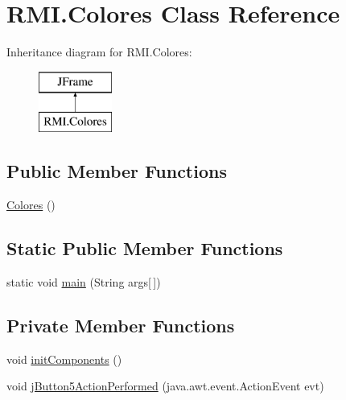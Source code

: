 \hypertarget{class_r_m_i_1_1_colores}{}\section{R\+M\+I.\+Colores Class Reference}
\label{class_r_m_i_1_1_colores}
Inheritance diagram for R\+M\+I.\+Colores\+:\begin{figure}[H]
\begin{center}
\leavevmode
\includegraphics[height=2.000000cm]{class_r_m_i_1_1_colores}
\end{center}
\end{figure}
\subsection*{Public Member Functions}
\begin{DoxyCompactItemize}
\item 
\mbox{\hyperlink{class_r_m_i_1_1_colores_a9d1a322e10d3c217309e02017973b5f0}{Colores}} ()
\end{DoxyCompactItemize}
\subsection*{Static Public Member Functions}
\begin{DoxyCompactItemize}
\item 
static void \mbox{\hyperlink{class_r_m_i_1_1_colores_aea22d7de357030bdee160e3a46a9720e}{main}} (String args\mbox{[}$\,$\mbox{]})
\end{DoxyCompactItemize}
\subsection*{Private Member Functions}
\begin{DoxyCompactItemize}
\item 
void \mbox{\hyperlink{class_r_m_i_1_1_colores_a9d5b44a5476dfd578973b5944d4bff20}{init\+Components}} ()
\item 
void \mbox{\hyperlink{class_r_m_i_1_1_colores_a9f457076530e2ee7660ccd9b4c9a1898}{j\+Button5\+Action\+Performed}} (java.\+awt.\+event.\+Action\+Event evt)
\end{DoxyCompactItemize}
